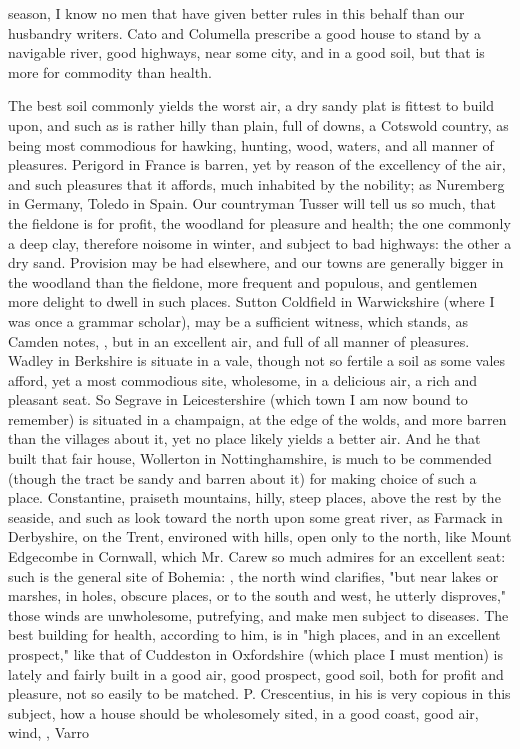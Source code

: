 {season, I know no men that have given better rules in this behalf than our husbandry writers. Cato and Columella prescribe a good house to stand by a navigable river, good highways, near some city, and in a good soil, but that is more for commodity than health.

The best soil commonly yields the worst air, a dry sandy plat is fittest to build upon, and such as is rather hilly than plain, full of downs, a Cotswold country, as being most commodious for hawking, hunting, wood, waters, and all manner of pleasures. Perigord in France is barren, yet by reason of the excellency of the air, and such pleasures that it affords, much inhabited by the nobility; as Nuremberg in Germany, Toledo in Spain. Our countryman Tusser will tell us so much, that the fieldone is for profit, the woodland for pleasure and health; the one commonly a deep clay, therefore noisome in winter, and subject to bad highways: the other a dry sand. Provision may be had elsewhere, and our towns are generally bigger in the woodland than the fieldone, more frequent and populous, and gentlemen more delight to dwell in such places. Sutton \label{mention:coldfield}Coldfield in Warwickshire (where I was once a grammar scholar), may be a sufficient witness, which stands, as Camden notes, , but in an excellent air, and full of all manner of pleasures. Wadley in Berkshire is situate in a vale, though not so fertile a soil as some vales afford, yet a most commodious site, wholesome, in a delicious air, a rich and pleasant seat. So Segrave in Leicestershire (which town I am now bound to remember) is situated in a champaign, at the edge of the wolds, and more barren than the villages about it, yet no place likely yields a better air. And he that built that fair house, Wollerton in Nottinghamshire, is much to be commended (though the tract be sandy and barren about it) for making choice of such a place. Constantine,  praiseth mountains, hilly, steep places, above the rest by the seaside, and such as look toward the north upon some great river, as Farmack in Derbyshire, on the Trent, environed with hills, open only to the north, like Mount Edgecombe in Cornwall, which Mr. Carew so much admires for an excellent seat: such is the general site of Bohemia: , the north wind clarifies, "but near lakes or marshes, in holes, obscure places, or to the south and west, he utterly disproves," those winds are unwholesome, putrefying, and make men subject to diseases. The best building for health, according to him, is in "high places, and in an excellent prospect," like that of Cuddeston in Oxfordshire (which place I must  mention) is lately and fairly built in a good air, good prospect, good soil, both for profit and pleasure, not so easily to be matched. P. Crescentius, in his  is very copious in this subject, how a house should be wholesomely sited, in a good coast, good air, wind, \etc{}, Varro }
